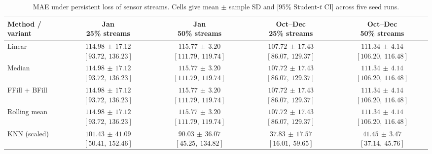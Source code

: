 \begin{table}[htbp]
\centering
\caption{{MAE under persistent loss of sensor streams. Cells give mean $\pm$ sample SD and [95\% Student-$t$ CI] across five seed runs.}}
\label{tab:p03_A1}
\begingroup
\footnotesize
\setlength{\tabcolsep}{3pt}
\renewcommand{\arraystretch}{1.15}
\begin{tabular}{lcccc}
\toprule
Method / variant & \makecell{Jan\\25\% streams} & \makecell{Jan\\50\% streams} & \makecell{Oct--Dec\\25\% streams} & \makecell{Oct--Dec\\50\% streams} \\
\midrule
Linear & \makecell[c]{$114.98\,\pm\,17.12$\\$[93.72,\ 136.23]$} & \makecell[c]{$115.77\,\pm\,3.20$\\$[111.79,\ 119.74]$} & \makecell[c]{$107.72\,\pm\,17.43$\\$[86.07,\ 129.37]$} & \makecell[c]{$111.34\,\pm\,4.14$\\$[106.20,\ 116.48]$} \\
Median & \makecell[c]{$114.98\,\pm\,17.12$\\$[93.72,\ 136.23]$} & \makecell[c]{$115.77\,\pm\,3.20$\\$[111.79,\ 119.74]$} & \makecell[c]{$107.72\,\pm\,17.43$\\$[86.07,\ 129.37]$} & \makecell[c]{$111.34\,\pm\,4.14$\\$[106.20,\ 116.48]$} \\
FFill + BFill & \makecell[c]{$114.98\,\pm\,17.12$\\$[93.72,\ 136.23]$} & \makecell[c]{$115.77\,\pm\,3.20$\\$[111.79,\ 119.74]$} & \makecell[c]{$107.72\,\pm\,17.43$\\$[86.07,\ 129.37]$} & \makecell[c]{$111.34\,\pm\,4.14$\\$[106.20,\ 116.48]$} \\
Rolling mean & \makecell[c]{$114.98\,\pm\,17.12$\\$[93.72,\ 136.23]$} & \makecell[c]{$115.77\,\pm\,3.20$\\$[111.79,\ 119.74]$} & \makecell[c]{$107.72\,\pm\,17.43$\\$[86.07,\ 129.37]$} & \makecell[c]{$111.34\,\pm\,4.14$\\$[106.20,\ 116.48]$} \\
KNN (scaled) & \makecell[c]{$101.43\,\pm\,41.09$\\$[50.41,\ 152.46]$} & \makecell[c]{$90.03\,\pm\,36.07$\\$[45.25,\ 134.82]$} & \makecell[c]{$37.83\,\pm\,17.57$\\$[16.01,\ 59.65]$} & \makecell[c]{$41.45\,\pm\,3.47$\\$[37.14,\ 45.76]$} \\

\end{tabular}
\end{table}
